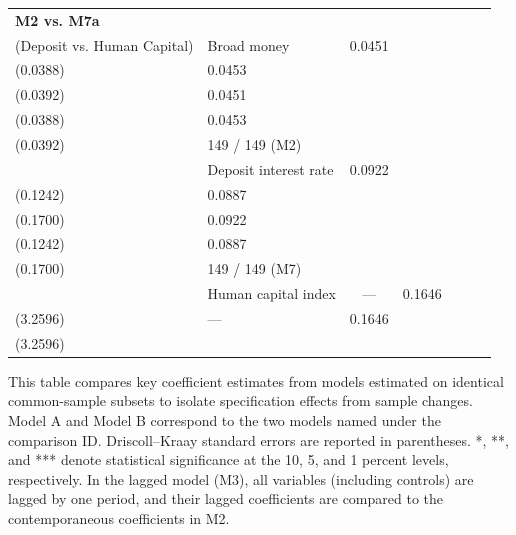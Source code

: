 \begin{table}[htbp]
\begin{minipage}{\textwidth}
{\begin{tabular}{llccccc}
\midrule
\textbf{M2 vs. M7a}\\(Deposit vs. Human Capital) & Broad money & 0.0451\\(0.0388) & 0.0453\\(0.0392) & 0.0451\\(0.0388) & 0.0453\\(0.0392) & 149 / 149 (M2) \\
 & Deposit interest rate & 0.0922\\(0.1242) & 0.0887\\(0.1700) & 0.0922\\(0.1242) & 0.0887\\(0.1700) & 149 / 149 (M7) \\
 & Human capital index & --- & 0.1646\\(3.2596) & --- & 0.1646\\(3.2596) & \\
\midrule
\bottomrule
\end{tabular}
}
\vskip 4pt
\footnotesize
This table compares key coefficient estimates from models estimated on identical common-sample subsets to isolate specification effects from sample changes. Model A and Model B correspond to the two models named under the comparison ID. Driscoll--Kraay standard errors are reported in parentheses. *, **, and *** denote statistical significance at the 10, 5, and 1 percent levels, respectively. In the lagged model (M3), all variables (including controls) are lagged by one period, and their lagged coefficients are compared to the contemporaneous coefficients in M2.
\end{minipage}
\end{table}